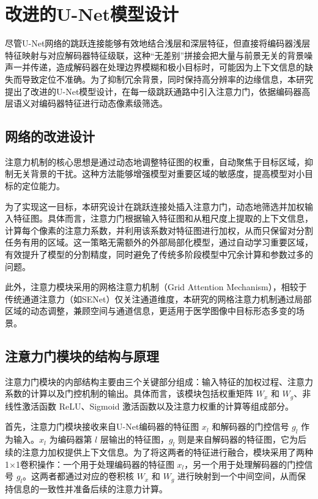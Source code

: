 \section{改进的U-Net模型设计}

尽管U-Net网络的跳跃连接能够有效地结合浅层和深层特征，但直接将编码器浅层特征映射与对应解码器特征级联，这种“无差别”拼接会把大量与前景无关的背景噪声一并传递，造成解码器在处理边界模糊和极小目标时，可能因为上下文信息的缺失而导致定位不准确。为了抑制冗余背景，同时保持高分辨率的边缘信息，本研究提出了改进的U-Net模型设计，在每一级跳跃通路中引入注意力门，依据编码器高层语义对编码器特征进行动态像素级筛选。

\subsection{网络的改进设计}

注意力机制的核心思想是通过动态地调整特征图的权重，自动聚焦于目标区域，抑制无关背景的干扰。这种方法能够增强模型对重要区域的敏感度，提高模型对小目标的定位能力\cite{oktay2018}。

为了实现这一目标，本研究设计在跳跃连接处插入注意力门，动态地筛选并加权输入特征图。具体而言，注意力门根据输入特征图和从粗尺度上提取的上下文信息，计算每个像素的注意力系数，并利用该系数对特征图进行加权，从而只保留对分割任务有用的区域。这一策略无需额外的外部局部化模型，通过自动学习重要区域，有效提升了模型的分割精度，同时避免了传统多阶段模型中冗余计算和参数过多的问题。

此外，注意力模块采用的网格注意力机制（Grid Attention Mechanism），相较于传统通道注意力（如SENet）仅关注通道维度，本研究的网格注意力机制通过局部区域的动态调整，兼顾空间与通道信息，更适用于医学图像中目标形态多变的场景。

\subsection{注意力门模块的结构与原理}

注意力门模块的内部结构主要由三个关键部分组成：输入特征的加权过程、注意力系数的计算以及门控机制的输出。具体而言，该模块包括权重矩阵 $W_x$ 和 $W_g$、非线性激活函数 ReLU、Sigmoid 激活函数以及注意力权重的计算等组成部分。

首先，注意力门模块接收来自U-Net编码器的特征图 $x_l$ 和解码器的门控信号 $g_l$ 作为输入。$x_l$ 为编码器第 $l$ 层输出的特征图，$g_l$ 则是来自解码器的特征图，它为后续的注意力加权提供上下文信息。为了将这两者的特征进行融合，模块采用了两种1×1卷积操作：一个用于处理编码器的特征图 $x_l$，另一个用于处理解码器的门控信号 $g_l$。这两者都通过对应的卷积核 $W_x$ 和 $W_g$ 进行映射到一个中间空间，从而保持信息的一致性并准备后续的注意力计算。

